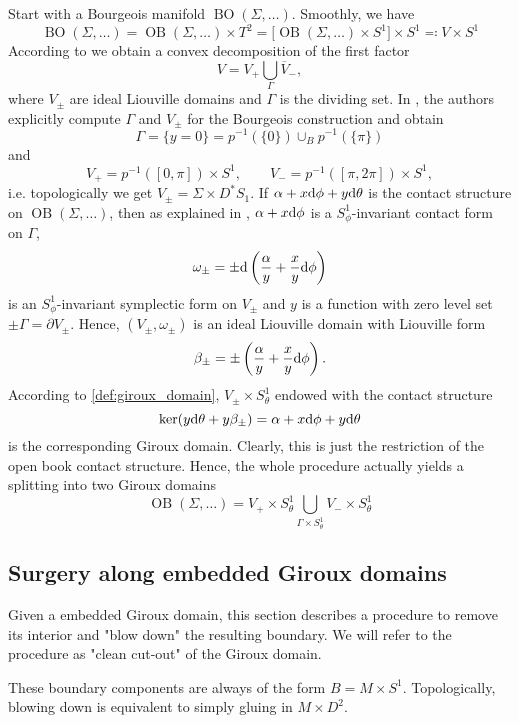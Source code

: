 Start with a Bourgeois manifold $\operatorname{BO}(\Sigma,\dots)$.
Smoothly, we have
\[
    \operatorname{BO}(\Sigma,\dots) = \operatorname{OB}(\Sigma, \dots) \times T^2 
    = \big[\operatorname{OB}(\Sigma, \dots) \times S^1\big] \times S^1 
    \eqqcolon V \times S^1
\]
According to \cite[Section 6]{DG12} we obtain a convex decomposition of the first factor
\[
    V = V_+ \bigcup_\Gamma \overline{V}_-,
\]
where $V_\pm$ are ideal Liouville domains and $\Gamma$ is the dividing set.
In \cite[Section 5.3]{DG12}, the authors explicitly compute $\Gamma$ and 
$V_\pm$ for the Bourgeois construction and obtain %
\[
    \Gamma = \{y = 0\} = p^{-1}(\{0\}) \cup_B p^{-1}(\{\pi\})
\]
and
\[
    V_+ = p^{-1}([0, \pi]) \times S^1, \qquad V_- = p^{-1}([\pi, 2\pi]) \times S^1,
\]
i.e. topologically we get $V_\pm = \Sigma \times D^*S_1$.
If $\alpha + x \mathrm{d} \phi + y \mathrm{d} \theta$ is the contact structure on $\operatorname{OB}(\Sigma, \dots)$,
then as explained in \cite[Section 5.3]{DG12}, $\alpha + x \mathrm{d} \phi$ is a 
$S^1_\phi$-invariant contact form on $\Gamma$,
\[
    \omega_\pm = \pm \mathrm{d} \left(\frac{\alpha}{y} + \frac{x}{y}\mathrm{d} \phi\right) 
\]
is an $S^1_\phi$-invariant symplectic form on $V_\pm$ and
$y$ is a function with zero level set $\pm \Gamma = \partial V_\pm$.
Hence, $(V_\pm, \omega_\pm)$ is an ideal Liouville domain with Liouville form
\[
    \beta_\pm = \pm \left(\frac{\alpha}{y} + \frac{x}{y}\mathrm{d} \phi\right).
\]
According to \cref{def:giroux_domain}, $V_\pm \times S^1_\theta$
endowed with the contact structure 
\[
    \ker(y \mathrm{d} \theta + y \beta_\pm) = \alpha + x \mathrm{d} \phi + y \mathrm{d} \theta
\]
is the corresponding Giroux domain. Clearly, this is just the restriction
of the open book contact structure. Hence, the whole procedure actually yields a
splitting into two Giroux domains
\[
    \operatorname{OB}(\Sigma, \dots) = V_+ \times S^1_\theta 
    \bigcup_{\Gamma \times S^1_\theta} V_- \times S^1_\theta
\]

\subsection*{Surgery along embedded Giroux domains}
Given a embedded Giroux domain, this section describes a procedure
to remove its interior and "blow down" the resulting boundary.
We will refer to the procedure as "clean cut-out" of the Giroux domain.

These boundary components are always of the form $B = M \times S^1$.
Topologically, blowing down is equivalent to simply gluing in $M \times D^2$.

